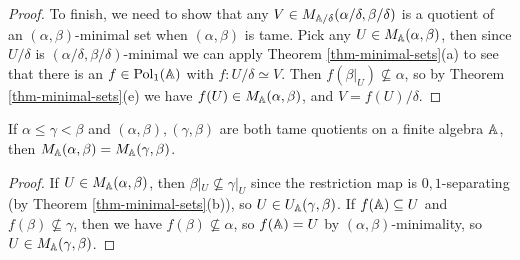 \begin{appendices}
\begin{proof}
To finish, we need to show that any $V \in M_{\mathbb{A}/\delta}(\alpha/\delta,\beta/\delta)$ is a quotient of an $(\alpha,\beta)$-minimal set when $(\alpha,\beta)$ is tame. Pick any $U \in M_{\mathbb{A}}(\alpha,\beta)$, then since $U/\delta$ is $(\alpha/\delta,\beta/\delta)$-minimal we can apply Theorem \ref{thm-minimal-sets}(a) to see that there is an $f \in \operatorname{Pol}_1(\mathbb{A})$ with $f : U/\delta \simeq V$. Then $f(\beta|_U) \not\subseteq \alpha$, so by Theorem \ref{thm-minimal-sets}(e) we have $f(U) \in M_{\mathbb{A}}(\alpha,\beta)$, and $V = f(U)/\delta$.
\end{proof}

\begin{comment}
\begin{prop} If $(\alpha,\beta)$ is a tame congruence quotient on a finite algebra $\bA$, and if $C$ is a congruence class of $\beta$ which is not also a congruence class of $\alpha$, then $\bA|_C/\alpha|_C$ is a tame algebra.
\end{prop}
\begin{proof} By Corollary \ref{cor-trace-closure}, there is some $(\alpha,\beta)$-trace $N$ of some $(\alpha,\beta)$-minimal set $U$ such that $N \subseteq C$. By Theorem \ref{thm-minimal-sets}(b), there is some idempotent $e \in E(\bA)$ such that $e(\bA) = U$. Since $e$ preserves $\beta$ and $e(N) = N \subseteq C$, we must have $e(C) \subseteq C$, so $e \in E(\bA|_C)$. We will prove that $N = U \cap C$ is an $(\alpha|_C,1_C)$-minimal set of $\bA|_C$, and that the restriction homomorphism $\llbracket \alpha|_C, 1_C \rrbracket \twoheadrightarrow \llbracket \alpha|_N, 1_N \rrbracket$ is $0,1$-separating - this will allow us to apply the previous proposition.

If $f(C) \subseteq N$ for some $f \in \Pol_1(\bA|_C)$ such that $f(C)$ is not contained in any congruence class of $\alpha$, then by Corollary \ref{cor-trace-iso} we have $f : N \simeq f(N)$, so in fact $f(N) = N$. This proves that $N$ is an $(\alpha|_C,1_C)$-minimal set of $\bA|_C$.

Now suppose that $(x,y) \in C^2 \setminus \alpha|_C$. Then by Theorem \ref{thm-minimal-sets}
\end{proof}
\end{comment}

\begin{prop} If $\alpha \le \gamma < \beta$ and $(\alpha,\beta), (\gamma,\beta)$ are both tame quotients on a finite algebra $\mathbb{A}$, then $M_{\mathbb{A}}(\alpha,\beta) = M_{\mathbb{A}}(\gamma,\beta)$.
\end{prop}
\begin{proof} If $U \in M_{\mathbb{A}}(\alpha,\beta)$, then $\beta|_U \not\subseteq \gamma|_U$ since the restriction map is $0,1$-separating (by Theorem \ref{thm-minimal-sets}(b)), so $U \in U_{\mathbb{A}}(\gamma,\beta)$. If $f(\mathbb{A}) \subseteq U$ and $f(\beta) \not\subseteq \gamma$, then we have $f(\beta) \not\subseteq \alpha$, so $f(\mathbb{A}) = U$ by $(\alpha,\beta)$-minimality, so $U \in M_{\mathbb{A}}(\gamma,\beta)$.


\end{proof}
\end{appendices}
